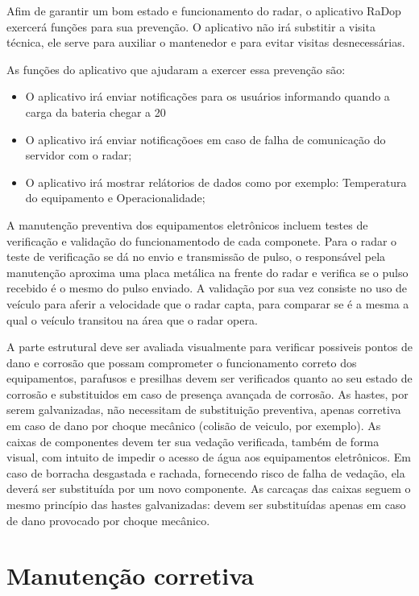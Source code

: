 Afim de garantir um bom estado e funcionamento do radar, o aplicativo RaDop exercerá funções para sua prevenção. O aplicativo não irá substitir a visita técnica, ele serve para auxiliar o mantenedor e  para evitar visitas desnecessárias.

As funções do aplicativo que ajudaram a exercer essa prevenção são:
\begin{itemize}
\item O aplicativo irá enviar notificações para os usuários informando quando a carga da bateria chegar a 20%
\item O aplicativo irá enviar notificaçõoes em caso de falha de comunicação do servidor com o radar;
\item O aplicativo irá mostrar relátorios de dados como por exemplo: Temperatura do equipamento e Operacionalidade;
\end{itemize}

A manutenção preventiva dos equipamentos eletrônicos incluem testes de verificação e validação do funcionamentodo de cada componete.
Para o radar o teste de verificação se dá no envio e transmissão de pulso, o responsável pela manutenção aproxima uma placa metálica na frente do radar e verifica se o pulso recebido é o mesmo do pulso enviado. A validação por sua vez consiste no uso de veículo para aferir a velocidade que o radar capta, para comparar se é a mesma a qual o veículo transitou na área que o radar opera.

A parte estrutural deve ser avaliada visualmente para verificar possiveis pontos de dano e corrosão que possam comprometer o funcionamento correto dos equipamentos, parafusos e presilhas devem ser verificados quanto ao seu estado de corrosão e substituidos em caso de presença avançada de corrosão. As hastes, por serem galvanizadas, não necessitam de substituição preventiva, apenas corretiva em caso de dano por choque mecânico (colisão de veiculo, por exemplo). As caixas de componentes devem ter sua vedação verificada, também de forma visual, com intuito de impedir o acesso de água aos equipamentos eletrônicos. Em caso de borracha desgastada e rachada, fornecendo risco de falha de vedação, ela deverá ser substituída por um novo componente. As carcaças das caixas seguem o mesmo princípio das hastes galvanizadas: devem ser substituídas apenas em caso de dano provocado por choque mecânico. 



\section{Manutenção corretiva}

